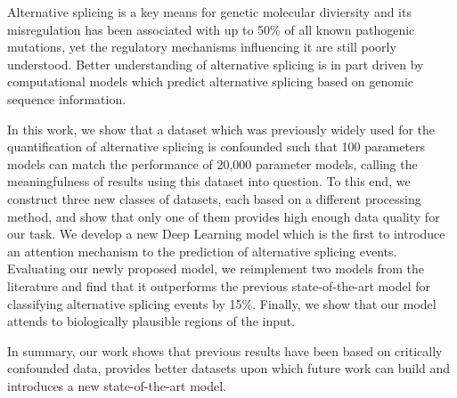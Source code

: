 
Alternative splicing is a key means for genetic molecular diviersity
and its misregulation has been associated with up to 50\% of all known pathogenic mutations, yet the regulatory mechanisms influencing it are still poorly understood. Better understanding of alternative splicing is in part driven by computational models which predict alternative splicing based on genomic sequence information. 

In this work, we show that a dataset which was previously widely used for the quantification of alternative splicing is confounded such that 100 parameters models can match the performance of 20,000 parameter models, calling the meaningfulness of results using this dataset into question. To this end, we construct three new classes of datasets, each based on a different processing method, and show that only one of them provides high enough data quality for our task. We develop a new Deep Learning model which is the first to introduce an attention mechanism to the prediction of alternative splicing events. Evaluating our newly proposed model, we reimplement two models from the literature and find that it outperforms the previous state-of-the-art model for classifying alternative splicing events by 15\%. %
Finally, we show that our model attends to biologically plausible regions of the input. 


In summary, our work shows that previous results have been based on critically confounded data,
provides better datasets upon which future work can build and introduces a new state-of-the-art model. 

